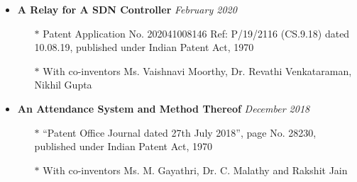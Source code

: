 \documentclass[10pt,a4paper]{article}
\begin{document}
\begin{tcolorbox}[enhanced,breakable,attach boxed title to top left={yshift=-3mm,yshifttext=-1mm},
		colback=aliceblue,colframe=blue,colbacktitle=blue,
		title=Publications,fonttitle=\large\bfseries,
	boxed title style={size=small,colframe=blue}]

    \begin{itemize}[noitemsep,nolistsep,leftmargin=0pt]
    \item{\textbf{A Relay for A SDN Controller}} \hfill \textit{February 2020}
        \begin{itemize}[leftmargin=*]
        \setlength\itemsep{-0.25em}
            \item[$\ast$]{Patent Application No. 202041008146 Ref: P/19/2116 (CS.9.18) dated 10.08.19, published under Indian Patent Act, 1970}
            \item[$\ast$]{With co-inventors Ms. Vaishnavi Moorthy, Dr. Revathi Venkataraman, Nikhil Gupta}
	    \end{itemize}
    \item{\textbf{An Attendance System and Method Thereof}} \hfill \textit{December 2018}
	    \begin{itemize}[leftmargin=*]
	    \setlength\itemsep{-0.25em}
	        \item[$\ast$]{``Patent Office Journal dated 27th July 2018'', page No. 28230, published under Indian Patent Act, 1970}
	        \item[$\ast$]{With co-inventors Ms. M. Gayathri, Dr. C. Malathy and Rakshit Jain}
	    \end{itemize}
	\end{itemize}
\end{tcolorbox}
\end{document}
